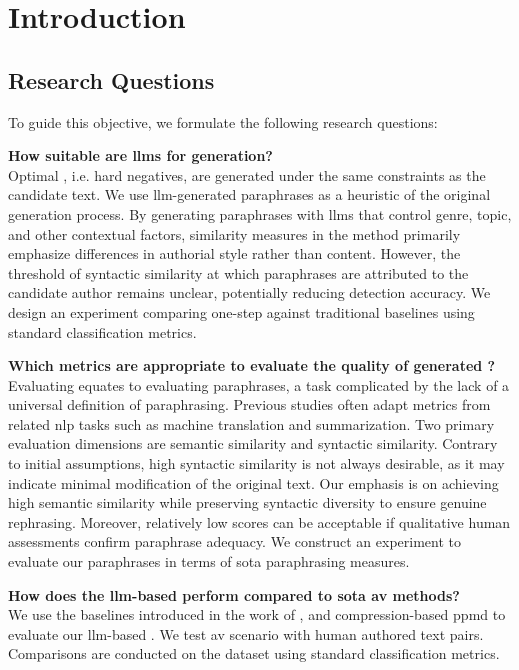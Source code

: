 \chapter{Introduction}
\label{chap:introduction}





\section{Research Questions}
\label{sec:research_questions}
To guide this objective, we formulate the following research questions:
\begin{questions}
    \item \textbf{How suitable are \acp{llm} for \imp{} generation?} \label{enum:rq1} \hfill \\
    Optimal \imps{}, i.e. hard negatives, are generated under the same constraints as the candidate text.
    We use \ac{llm}-generated paraphrases as a heuristic of the original generation process.
    By generating paraphrases with \acp{llm} that control genre, topic, and other contextual factors, similarity measures in the \imp{} method primarily emphasize differences in authorial style rather than content.
    However, the threshold of syntactic similarity at which paraphrases are attributed to the candidate author remains unclear, potentially reducing detection accuracy.
    We design an experiment comparing one-step against traditional baselines using standard classification metrics.

    \item \textbf{Which metrics are appropriate to evaluate the quality of generated \imps{}?} \label{enum:rq2} \hfill \\
    Evaluating \imps{} equates to evaluating paraphrases, a task complicated by the lack of a universal definition of paraphrasing.
    Previous studies often adapt metrics from related \ac{nlp} tasks such as machine translation and summarization.
    Two primary evaluation dimensions are semantic similarity and syntactic similarity.
    Contrary to initial assumptions, high syntactic similarity is not always desirable, as it may indicate minimal modification of the original text.
    Our emphasis is on achieving high semantic similarity while preserving syntactic diversity to ensure genuine rephrasing.
    Moreover, relatively low scores can be acceptable if qualitative human assessments confirm paraphrase adequacy.
    We construct an experiment to evaluate our paraphrases in terms of \acl{sota} paraphrasing measures. 

    \item \textbf{How does the \ac{llm}-based \impAppr{} perform compared to \acl{sota} \ac{av} methods?} \label{enum:rq3} \hfill \\
    We use the baselines introduced in the work of \citet{koppel_determining_2014}, \unmasking{} and compression-based \ac{ppmd} to evaluate our \ac{llm}-based \impAppr{}.
    We test \ac{av} scenario with human authored text pairs.
    Comparisons are conducted on the \dataStudent{} dataset using standard classification metrics.
    
\end{questions}
